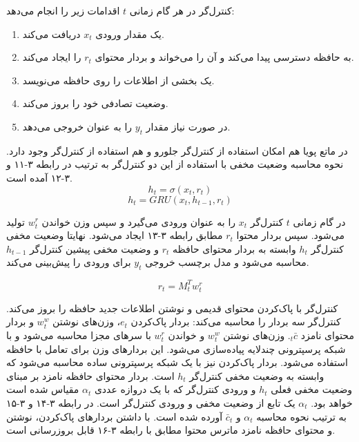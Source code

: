 کنترل‌گر در هر گام زمانی $t$ اقدامات زیر را انجام می‌دهد:
\begin{enumerate}
\item یک مقدار ورودی $x_t$ دریافت می‌کند.
\item به حافظه دسترسی پیدا می‌کند و آن را می‌خواند و بردار محتوای $r_t$ را ایجاد می‌کند.
\item یک بخشی از اطلاعات را روی حافظه می‌نویسد.
\item وضعیت تصادفی خود را بروز می‌کند.
\item در صورت نیاز مقدار $y_t$ را به عنوان خروجی می‌دهد.
\end{enumerate}

در ماتع پویا هم امکان استفاده از کنترل‌گر جلورو و هم استفاده از کنترل‌گر  وجود دارد. نحوه محاسبه وضعیت مخفی با استفاده از این دو کنترل‌گر به ترتیب در رابطه ۳-۱۱ و ۳-۱۲ آمده است.\cite{gulcehre2018dynamic}
\begin{equation}
h_t = \sigma(x_t, r_t)
\end{equation}
\begin{equation}
h_t = GRU(x_t, h_{t-1}, r_t)
\end{equation}

در گام زمانی $t$ کنترل‌گر $x_t$‌ را به عنوان ورودی می‌گیرد و سپس وزن خواندن $w_t^r$ تولید می‌شود. سپس بردار محتوا $r_t$ مطابق رابطه ۳-۱۳ ایجاد می‌شود. نهایتا وضعیت مخفی کنترل‌گر $h_t$ وابسته به بردار محتوای حافظه $r_t$ و وضعیت مخفی پیشین کنترل‌گر $h_{t-1}$ محاسبه می‌شود و مدل برچسب خروجی $y_t$ برای ورودی را پیش‌بینی می‌کند.\cite{gulcehre2018dynamic}

\begin{equation}
r_t = M_t^Tw_t^r
\end{equation}
  
کنترل‌گر با پاک‌کردن محتوای قدیمی و نوشتن اطلاعات جدید حافظه را بروز می‌کند. کنترل‌گر سه بردار را محاسبه می‌کند: بردار پاک‌کردن $e_t$، وزن‌های نوشتن $w_t^w$ و بردار محتوای نامزد $_t\bar{c}$. وزن‌های نوشتن $w_t^w$ و خواندن $w_t^r$ با سرهای مجزا محاسبه می‌شود و با شبکه پرسپترونی چندلایه  پیاده‌سازی می‌شود. این بردارهای وزن برای تعامل با حافظه استفاده می‌شود. بردار پاک‌کردن نیز با یک شبکه پرسپترونی ساده محاسبه می‌شود که وابسته به وضعیت مخفی کنترل‌گر $h_t$ است. بردار محتوای حافظه نامزد بر مبنای وضعیت مخفی فعلی $h_t$ و ورودی کنترل‌گر که با یک دروازه عددی $\alpha_t$ مقیاس شده است خواهد بود. $\alpha_t$ یک تابع از وضعیت مخفی و ورودی کنترل‌گر است. در رابطه ۳-۱۴ و ۳-۱۵ به ترتیب نحوه محاسبه $\alpha_t$ و $\bar{c}_t$ آورده شده است. با داشتن بردارهای پاک‌کردن، نوشتن و محتوای حافظه نامزد ماترس محتوا مطابق با رابطه ۳-۱۶ قابل بروزرسانی است.\cite{gulcehre2018dynamic}

